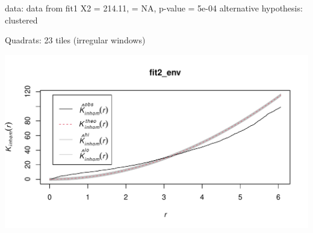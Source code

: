 \documentclass[
  12pt,
]{article}
\begin{document}
data: data from fit1 X2 = 214.11, = NA, p-value = 5e-04 alternative
hypothesis: clustered

Quadrats: 23 tiles (irregular windows)

\includegraphics{JStevenRaquel_STATS295_Final_files/figure-latex/plot-fit2-envelope-1.pdf}
\end{document}
